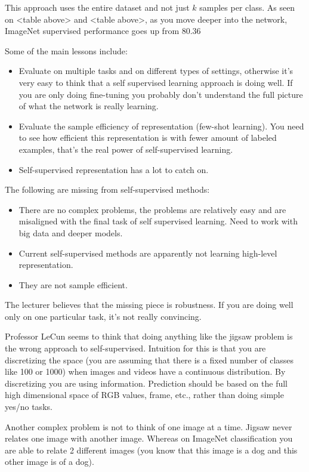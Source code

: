 This approach uses the entire dataset and not just $k$ samples per class.  As seen on <table above> and <table above>, as you move deeper into the network, ImageNet supervised performance goes up from 80.36%

Some of the main lessons include:
\begin{itemize}
\item Evaluate on multiple tasks and on different types of settings, otherwise it’s very easy to think that a self supervised learning approach is doing well. If you are only doing fine-tuning you probably don’t understand the full picture of what the network is really learning.
\item Evaluate the sample efficiency of representation (few-shot learning). You need to see how efficient this representation is with fewer amount of labeled examples, that’s the real power of self-supervised learning.
\item Self-supervised representation has a lot to catch on.
\end{itemize}
The following are missing from self-supervised methods:
\begin{itemize}
\item There are no complex problems, the problems are relatively easy and are misaligned with the final task of self supervised learning. Need to work with big data and deeper models.
\item Current self-supervised methods are apparently not learning high-level representation.
\item They are not sample efficient.
\end{itemize}

The lecturer believes that the missing piece is robustness. If you are doing well only on one particular task, it’s not really convincing.

Professor LeCun seems to think that doing anything like the jigsaw problem is the wrong approach to self-supervised. Intuition for this is that you are discretizing the space (you are assuming that there is a fixed number of classes like 100 or 1000) when images and videos have a continuous distribution. By discretizing you are using information. Prediction should be based on the full high dimensional space of RGB values, frame, etc., rather than doing simple yes/no tasks.

Another complex problem is not to think of one image at a time. Jigsaw never relates one image with another image. Whereas on ImageNet classification you are able to relate 2 different images (you know that this image is a dog and this other image is of a dog).

